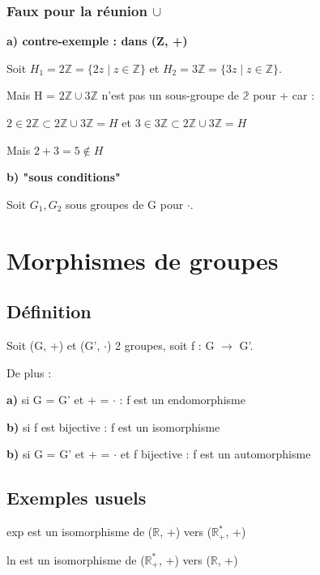 \documentclass[12pt,a4paper,french]{book}
\begin{document}
\begin{spacing}{1.0}
			\subsubsection{Faux pour la réunion $\cup$}
			\textbf{a) contre-exemple : dans (Z, +)}
			
			Soit \(H_1 = 2\mathbb{Z} = \{ 2z \mid z \in \mathbb{Z} \}\) et \(H_2 = 3\mathbb{Z} = \{ 3z \mid z \in \mathbb{Z} \}\). 
			
			Mais H = \(2\mathbb{Z} \cup 3\mathbb{Z}\) n'est pas un sous-groupe de \(\mathbb{2}\) pour + car :
			
			\(2 \in 2\mathbb{Z} \subset 2\mathbb{Z} \cup 3\mathbb{Z} = H\) et \(3 \in 3\mathbb{Z} \subset 2\mathbb{Z} \cup 3\mathbb{Z} = H\)
			
			Mais \(2+3 = 5 \notin H\)
			
			\textbf{b) "sous conditions"}
			
			Soit \(G_1, G_2\) sous groupes de G pour \(\cdot\).
			
	\section{Morphismes de groupes}
		\subsection{Définition}
		Soit (G, +) et (G', $\cdot$) 2 groupes, soit f : G $\rightarrow$ G'.
		
		
		De plus :
		
		\textbf{a)} si G = G' et + = $\cdot$ : f est un endomorphisme
		
		\textbf{b)} si f est bijective : f est un isomorphisme
		
		\textbf{b)} si G = G' et + = $\cdot$ et f bijective : f est un automorphisme
		
		\subsection{Exemples usuels}
		exp est un isomorphisme de ($\mathbb{R}$, +) vers ($\mathbb{R}^*_+$, +)
		
		ln est un isomorphisme de ($\mathbb{R}^*_+$, +) vers ($\mathbb{R}$, +)
		

\end{spacing}
\end{document}
